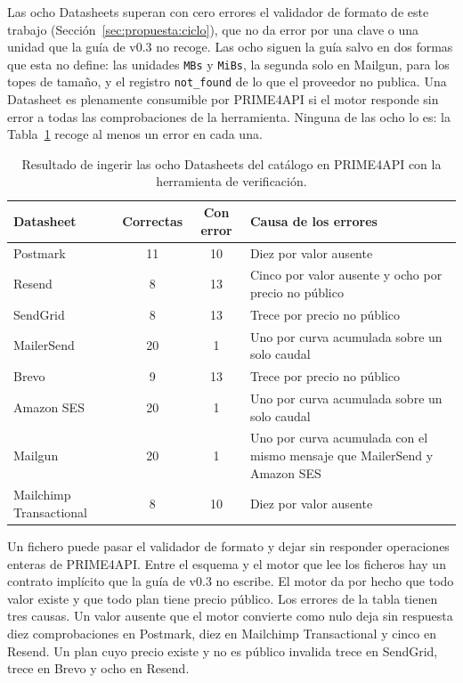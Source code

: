 Las ocho Datasheets superan con cero errores el validador de formato de este trabajo (Sección~\ref{sec:propuesta:ciclo}), que no da error por una clave o una unidad que la guía de v0.3 no recoge.
Las ocho siguen la guía salvo en dos formas que esta no define: las unidades \texttt{MBs} y \texttt{MiBs}, la segunda solo en Mailgun, para los topes de tamaño, y el registro \texttt{not\_found} de lo que el proveedor no publica.
Una Datasheet es plenamente consumible por PRIME4API si el motor responde sin error a todas las comprobaciones de la herramienta.
Ninguna de las ocho lo es: la Tabla~\ref{tab:verificacion} recoge al menos un error en cada una.

\begin{table}[tbp]
\centering
\begin{tabular}{|l|c|c|p{5.2cm}|}
\hline
\textbf{Datasheet} & \textbf{Correctas} & \textbf{Con error} & \textbf{Causa de los errores} \\
\hline
Postmark & 11 & 10 & Diez por valor ausente \\
\hline
Resend & 8 & 13 & Cinco por valor ausente y ocho por precio no público \\
\hline
SendGrid & 8 & 13 & Trece por precio no público \\
\hline
MailerSend & 20 & 1 & Uno por curva acumulada sobre un solo caudal \\
\hline
Brevo & 9 & 13 & Trece por precio no público \\
\hline
Amazon SES & 20 & 1 & Uno por curva acumulada sobre un solo caudal \\
\hline
Mailgun & 20 & 1 & Uno por curva acumulada con el mismo mensaje que MailerSend y Amazon SES \\
\hline
Mailchimp Transactional & 8 & 10 & Diez por valor ausente \\
\hline
\end{tabular}
\caption[Resultado de ingerir las ocho Datasheets del catálogo en PRIME4API con la herramienta de verificación]{Resultado de ingerir las ocho Datasheets del catálogo en PRIME4API con la herramienta de verificación.}
\label{tab:verificacion}
\end{table}

Un fichero puede pasar el validador de formato y dejar sin responder operaciones enteras de PRIME4API.
Entre el esquema y el motor que lee los ficheros hay un contrato implícito que la guía de v0.3 no escribe.
El motor da por hecho que todo valor existe y que todo plan tiene precio público.
Los errores de la tabla tienen tres causas.
Un valor ausente que el motor convierte como nulo deja sin respuesta diez comprobaciones en Postmark, diez en Mailchimp Transactional y cinco en Resend.
Un plan cuyo precio existe y no es público invalida trece en SendGrid, trece en Brevo y ocho en Resend.

